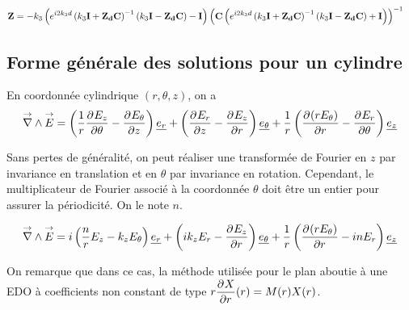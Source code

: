 \begin{align}
    \mat{Z}
    &=-k_3\left(e^{i2 k_3 d} \left(k_3\mat{I} + \mat{Z_d}\mat{C}\right)^{-1}\left(k_3\mat{I} - \mat{Z_d}\mat{C}\right) - \mat{I} \right)
    \left( \mat{C} \left( e^{i2 k_3 d} \left(k_3\mat{I} + \mat{Z_d}\mat{C}\right)^{-1}\left(k_3\mat{I} - \mat{Z_d}\mat{C}\right) + \mat{I} \right)\right)^{-1}
\end{align}








\subsection{Forme générale des solutions pour un cylindre}

\newcommand{\mr}{r}
\newcommand{\mt}{\theta}
\newcommand{\mz}{z}

\begin{figure}[htpb]
\centering
\begin{tikzpicture}

\end{tikzpicture}
\end{figure}

En coordonnée cylindrique $(r,\theta,z)$, on a
\begin{equation}
\vrot \vE = \left(\frac{1}{r}\ddr{\theta}{E_z} - \ddr{z}{E_\theta}\right)\v{e_r} + 
\left(\ddr{z}{E_r} - \ddr{r}{E_z}\right)\v{e_\theta} +
\frac{1}{r}\left(\ddr{r}{(rE_\theta)}-\ddr{\theta}{E_r}\right)\v{e_z}
\end{equation}

Sans pertes de généralité, on peut réaliser une transformée de Fourier en $z$ par invariance en translation et en $\theta$ par invariance en rotation. Cependant, le multiplicateur de Fourier associé à la coordonnée $\theta$ doit être un entier pour assurer la périodicité. On le note $n$.

\begin{equation}
\vrot \vE = i\left(\frac{n}{r}E_z - k_zE_\theta\right)\v{e_r} + 
\left(ik_zE_r - \ddr{r}{E_z}\right)\v{e_\theta} +
\frac{1}{r}\left(\ddr{r}{(rE_\theta)}-inE_r\right)\v{e_z}
\end{equation}

On remarque que dans ce cas, la méthode utilisée pour le plan aboutie à une EDO à coefficients non constant de type $r\ddr{r}{X}(r) = M(r)X(r)$.

